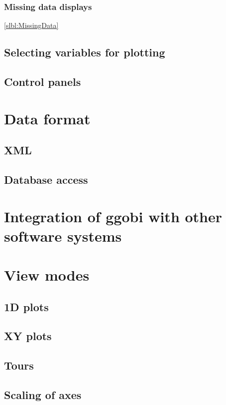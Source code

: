 \documentclass[11pt]{article}
\begin{document}
\subsubsection{Missing data displays}
\ref{slbl:MissingData}


\subsection{Selecting variables for plotting}
\subsection{Control panels}

\section{Data format}
\label{slbl:DataFormat}
\subsection {XML}
\label{slbl:XML}
\subsection {Database access}
\label{slbl:MySQL}

\section{Integration of ggobi with other software systems}
\label{slbl:Integration}

\section{View modes}
\label{slbl:ViewModes}

\subsection{1D plots}
\subsection{XY plots}
\subsection{Tours}
\label{slbl:1DTour}
\subsection{Scaling of axes}
\label{slbl:Scaling}
\end{document}
